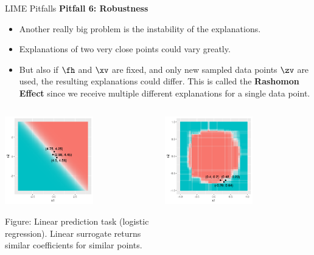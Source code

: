 \documentclass[11pt,compress,t,notes=noshow, xcolor=table]{beamer}
\begin{document}
\begin{vbframe}{LIME Pitfalls}
\textbf{Pitfall 6: Robustness}
\begin{itemize}
	\item Another really big problem is the instability of the explanations. 
	\item Explanations of two very close points could vary greatly. 
	\item But also if $\fh$ and $\xv$ are fixed, and only new sampled data points $\zv$ are used, the resulting explanations could differ. This is called the \textbf{Rashomon Effect} since we receive multiple different explanations for a single data point. 
\end{itemize}
\vspace{-0.7cm}
\begin{columns}
	\begin{column}{0.48\textwidth}
		\begin{center}
		
		\includegraphics[width=0.6\textwidth]{figure/lime_robustness_1.png}
		
		\tiny{Figure: Linear prediction task (logistic regression). Linear surrogate returns similar coefficients for similar points.}
		
		\end{center}
	\end{column}
	\begin{column}{0.48\textwidth}
		\begin{center}
	\includegraphics[width=0.6\textwidth]{figure/lime_robustness_2.png}
	

\end{center}
\end{column}
\end{columns}
\end{vbframe}
\end{document}
